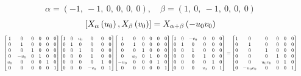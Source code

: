 \documentclass[11pt]{article}
\theoremstyle{definition}
\begin{document}
\[
\alpha = \left( -1, \  -1, \  0, \  0, \  0, \  0\right), \quad \beta = \left( 1, \  0, \  -1, \  0, \  0, \  0\right)
\]
\[
\scaletoalign{\textwidth}{\left[ X_{\alpha}\left(u_{0}\right), X_{\beta}\left(v_{0}\right) \right] = X_{\alpha + \beta}\left(- u_{0} v_{0}\right)}
\]
\[
\scaletoalign{\textwidth}{{\left[\begin{matrix}1 & 0 & 0 & 0 & 0 & 0\\0 & 1 & 0 & 0 & 0 & 0\\0 & 0 & 1 & 0 & 0 & 0\\0 & - u_{0} & 0 & 1 & 0 & 0\\u_{0} & 0 & 0 & 0 & 1 & 0\\0 & 0 & 0 & 0 & 0 & 1\end{matrix}\right]} {\left[\begin{matrix}1 & 0 & v_{0} & 0 & 0 & 0\\0 & 1 & 0 & 0 & 0 & 0\\0 & 0 & 1 & 0 & 0 & 0\\0 & 0 & 0 & 1 & 0 & 0\\0 & 0 & 0 & 0 & 1 & 0\\0 & 0 & 0 & - v_{0} & 0 & 1\end{matrix}\right]} {\left[\begin{matrix}1 & 0 & 0 & 0 & 0 & 0\\0 & 1 & 0 & 0 & 0 & 0\\0 & 0 & 1 & 0 & 0 & 0\\0 & u_{0} & 0 & 1 & 0 & 0\\- u_{0} & 0 & 0 & 0 & 1 & 0\\0 & 0 & 0 & 0 & 0 & 1\end{matrix}\right]} {\left[\begin{matrix}1 & 0 & - v_{0} & 0 & 0 & 0\\0 & 1 & 0 & 0 & 0 & 0\\0 & 0 & 1 & 0 & 0 & 0\\0 & 0 & 0 & 1 & 0 & 0\\0 & 0 & 0 & 0 & 1 & 0\\0 & 0 & 0 & v_{0} & 0 & 1\end{matrix}\right]} = {\left[\begin{matrix}1 & 0 & 0 & 0 & 0 & 0\\0 & 1 & 0 & 0 & 0 & 0\\0 & 0 & 1 & 0 & 0 & 0\\0 & 0 & 0 & 1 & 0 & 0\\0 & 0 & u_{0} v_{0} & 0 & 1 & 0\\0 & - u_{0} v_{0} & 0 & 0 & 0 & 1\end{matrix}\right]}}
\]
\end{document}
